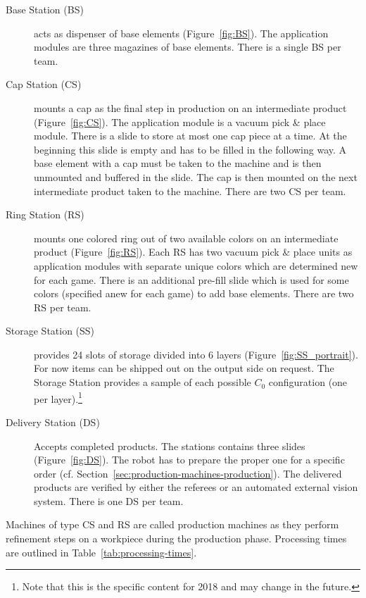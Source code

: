 \documentclass[12pt,twoside]{article}
\newcommand{\refsec}[1]{Section~\ref{#1}}
\newcommand{\reffig}[1]{Figure~\ref{#1}}
\newcommand{\reftab}[1]{Table~\ref{#1}}
\begin{document}
\begin{description}
\item[Base Station (BS)] acts as dispenser of base elements
  (\reffig{fig:BS}). The application modules are three magazines of
  base elements. There is a single BS per team.

\item[Cap Station (CS)] mounts a cap as the final step in production
  on an intermediate product (\reffig{fig:CS}). The application module
  is a vacuum pick \& place module. There is a slide to store at most
  one cap piece at a time. At the beginning this slide is empty and
  has to be filled in the following way.  A base element with a cap
  must be taken to the machine and is then unmounted and buffered in
  the slide. The cap is then mounted on the next intermediate product
  taken to the machine. There are two CS per team.

\item[Ring Station (RS)] mounts one colored ring out of two available
  colors on an intermediate product (\reffig{fig:RS}). Each RS has two
  vacuum pick \& place units as application modules with separate
  unique colors which are determined new for each game. There is an
  additional pre-fill slide which is used for some colors (specified
  anew for each game) to add base elements. There are two RS per team.

\item[Storage Station (SS)] provides 24 slots of storage divided into
  6 layers (\reffig{fig:SS_portrait}). For now items can be  shipped
  out on the output side on request. The Storage Station provides a
  sample of each possible $C_0$ configuration (one per
  layer).\footnote{Note that this is the specific content for 2018 and
  may change in the future.}

\item[Delivery Station (DS)] Accepts completed products. The stations
  contains three slides (\reffig{fig:DS}). The robot has to prepare
  the proper one for a specific order
  (cf. \refsec{sec:production-machines-production}). The delivered
  products are verified by either the referees or an automated
  external vision system. There is one DS per team.
\end{description}

\noindent
Machines of type CS and RS are called production machines as they
perform refinement steps on a workpiece during the production
phase. Processing times are outlined in \reftab{tab:processing-times}.
\end{document}

